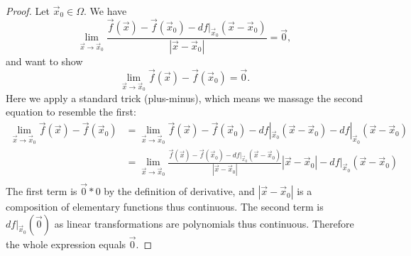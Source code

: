 \begin{proof}
    Let $\vec{x}_0\in\Omega$. We have 
    \[
    \lim_{\vec{x}\to\vec{x}_0} \frac{\vec{f}(\vec{x})-\vec{f}(\vec{x}_0)-df|_{\vec{x}_0}(\vec{x}-\vec{x}_0)}{|\vec{x}-\vec{x}_0|} =\vec{0},
    \]
    and want to show \[
        \lim_{\vec{x}\to\vec{x}_0} \vec{f}(\vec{x})-\vec{f}(\vec{x}_0)=\vec{0}.
    \]
    Here we apply a standard trick (plus-minus), which means we massage the second equation to resemble the first:\begin{align*}
        \lim_{\vec{x}\to\vec{x}_0} \vec{f}(\vec{x})-\vec{f}(\vec{x}_0) &= \lim_{\vec{x}\to\vec{x}_0} \vec{f}(\vec{x})-\vec{f}(\vec{x}_0)-df|_{\vec{x}_0}(\vec{x}-\vec{x}_0)-df|_{\vec{x}_0}(\vec{x}-\vec{x}_0)\\
        &=\lim_{\vec{x}\to\vec{x}_0} \frac{\vec{f}(\vec{x})-\vec{f}(\vec{x}_0)-df|_{\vec{x}_0}(\vec{x}-\vec{x}_0)}{|\vec{x}-\vec{x}_0|} |\vec{x}-\vec{x}_0|-df|_{\vec{x}_0}(\vec{x}-\vec{x}_0)\\
    \end{align*}
    The first term is $\vec{0}*0 $ by the definition of derivative, and $|\vec{x}-\vec{x}_0|$ is a composition of elementary functions thus continuous. The second term is $df|_{\vec{x}_0}(\vec{0})$ as linear transformations are polynomials thus continuous.
    Therefore the whole expression equals $\vec{0}$.
\end{proof}
